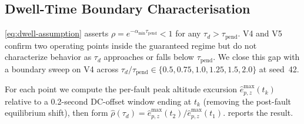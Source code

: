 
\subsection{Dwell-Time Boundary Characterisation}
\label{sec:VI-dwell}

\eqref{eq:dwell-assumption} asserts $\rho = e^{-\alpha_{\min}\tau_{\mathrm{pend}}} < 1$ for any $\tau_d > \tau_{\mathrm{pend}}$. V4 and V5 confirm two operating points inside the guaranteed regime but do not characterize behavior as $\tau_d$ approaches or falls below $\tau_{\mathrm{pend}}$. We close this gap with a boundary sweep on V4 across $\tau_d/\tau_{\mathrm{pend}} \in \{0.5, 0.75, 1.0, 1.25, 1.5, 2.0\}$ at seed~42.

For each point we compute the per-fault peak altitude excursion $\hat e_{p,z}^{\max}(t_k)$ relative to a 0.2-second DC-offset window ending at $t_k$ (removing the post-fault equilibrium shift), then form $\hat\rho(\tau_d) = \hat e_{p,z}^{\max}(t_2)/\hat e_{p,z}^{\max}(t_1)$.  reports the result.

